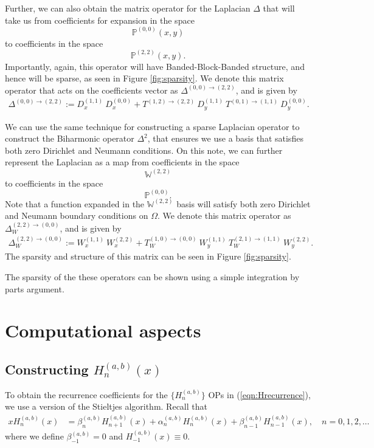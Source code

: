 \documentclass[11pt, oneside]{article}   	%
\newcommand{\bigP}{\mathbb{P}}
\newcommand{\bigPoo}{{\mathbb{P}^{(0,0)}}}
\newcommand{\laplacewtt}{\Delta_W^{(2,2)\to(0,0)}}
\newcommand{\laplaceoo}{\Delta^{(0,0)\to(2,2)}}
\newcommand{\bigW}{\mathbb{W}}
\begin{document}
Further, we can also obtain the matrix operator for the Laplacian $\Delta$ that will take us from coefficients for expansion in the space
$$
\bigPoo(x,y)
$$
to coefficients in the space
$$
\bigP^{(2,2)}(x,y).
$$
Importantly, again, this operator will have Banded-Block-Banded structure, and hence will be sparse, as seen in Figure \ref{fig:sparsity}. We denote this matrix operator that acts on the coefficients vector as $\laplaceoo$, and is given by
\begin{align}
    \laplaceoo := D_x^{(1,1)} \: D_x^{(0,0)} + T^{(1,2)\to(2,2)} \: D_y^{(1,1)} \: T^{(0,1)\to(1,1)} \: D_y^{(0,0)}.
\end{align}

We can use the same technique for constructing a sparse Laplacian operator to construct the Biharmonic operator $\Delta^2$, that ensures we use a basis that satisfies both zero Dirichlet and Neumann conditions. On this note, we can further represent the Laplacian as a map from coefficients in the space 
$$
\bigW^{(2,2)}
$$
to coefficients in the space
$$
\bigPoo.
$$
Note that a function expanded in the $\bigW^{(2,2)}$ basis will satisfy both zero Dirichlet and Neumann boundary conditions on $\Omega$. We denote this matrix operator as $\laplacewtt$, and is given by
\begin{align}
	\laplacewtt := W_x^{(1,1)} \: W_x^{(2,2)} + T_W^{(1,0)\to(0,0)} \: W_y^{(1,1)} \: T_W^{(2,1)\to(1,1)} \: W_y^{(2,2)}.
\end{align}
The sparsity and structure of this matrix can be seen in Figure \ref{fig:sparsity}.

The sparsity of the these operators can be shown using a simple integration by parts argument.



\section{Computational aspects}\label{Section:Computation}

\subsection{Constructing $H_n^{(a,b)}(x)$}

To obtain the recurrence coefficients for the $\{H_n^{(a,b)}\}$ OPs in (\ref{eqn:Hrecurrence}), we use a version of the Stieltjes algorithm. Recall that
\begin{align}
x H_n^{(a,b)}(x) &= \beta_n^{(a,b)} H_{n+1}^{(a,b)}(x) + \alpha_n^{(a,b)} H_n^{(a,b)}(x) + \beta_{n-1}^{(a,b)} H_{n-1}^{(a,b)}(x), \quad n = 0,1,2,\dots
\end{align}
where we define $\beta_{-1}^{(a,b)} = 0$ and $H_{-1}^{(a,b)}(x) \equiv 0$.
\end{document}
